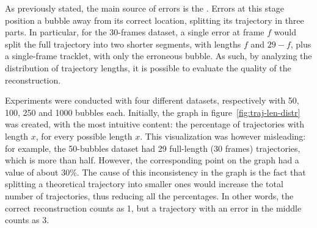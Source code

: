 As previously stated, the main source of errors is the \match*.
Errors at this stage position a bubble away from its correct location, splitting its trajectory in three parts.
In particular, for the 30-frames dataset, a single error at frame $f$ would split the full trajectory into two shorter segments, with lengths $f$ and $29-f$, plus a single-frame tracklet, with only the erroneous bubble.
As such, by analyzing the distribution of trajectory lengths, it is possible to evaluate the quality of the reconstruction.


Experiments were conducted with four different datasets, respectively with 50, 100, 250 and 1000 bubbles each.
Initially, the graph in figure~\ref{fig:traj-len-distr} was created, with the most intuitive content: the percentage of trajectories with length $x$, for every possible length $x$.
This visualization was however misleading: for example, the 50-bubbles dataset had 29 full-length (30 frames) trajectories, which is more than half.
However, the corresponding point on the graph had a value of about 30\%.
The cause of this inconsistency in the graph is the fact that splitting a theoretical trajectory into smaller ones would increase the total number of trajectories, thus reducing all the percentages.
In other words, the correct reconstruction counts as 1, but a trajectory with an error in the middle counts as 3.
